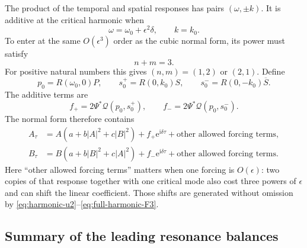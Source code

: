 \documentclass[11pt]{article}
\newcommand{\ii}{\mathrm{i}}
\newcommand{\ee}{\mathrm{e}}
\newcommand{\cQ}{\mathcal{Q}}
\begin{document}
The product of the temporal and spatial responses has pairs
$(\omega,\pm k)$.  It is additive at the critical harmonic when
\begin{equation}
  \omega=\omega_0+\epsilon^2\delta,
  \qquad k=k_0.
  \label{eq:mixed-resonance}
\end{equation}
To enter at the same $O(\epsilon^3)$ order as the cubic normal form, its power
must satisfy
\begin{equation}
  n+m=3.
  \label{eq:nplusm}
\end{equation}
For positive natural numbers this gives $(n,m)=(1,2)$ or $(2,1)$.  Define
\begin{equation}
  p_0=R(\omega_0,0)P,
  \qquad
  s_0^+=R(0,k_0)S,
  \qquad
  s_0^-=R(0,-k_0)\overline S.
\end{equation}
The additive terms are
\begin{equation}
  f_+=2\Psi^*\cQ(p_0,s_0^+),
  \qquad
  f_-=2\Psi^*\cQ(p_0,s_0^-).
  \label{eq:mixed-coefficients}
\end{equation}
The normal form therefore contains
\begin{subequations}
\begin{align}
  A_\tau&=A(a+b|A|^2+c|B|^2)
  +f_+\ee^{\ii\delta\tau}+\text{other allowed forcing terms},\\
  B_\tau&=B(a+b|B|^2+c|A|^2)
  +f_-\ee^{\ii\delta\tau}+\text{other allowed forcing terms}.
\end{align}
\end{subequations}
Here ``other allowed forcing terms'' matters when one forcing is
$O(\epsilon)$: two copies of that response together with one critical mode
also cost three powers of $\epsilon$ and can shift the linear coefficient.
Those shifts are generated without omission by
\eqref{eq:harmonic-u2}--\eqref{eq:full-harmonic-F3}.

\subsection{Summary of the leading resonance balances}
\end{document}
